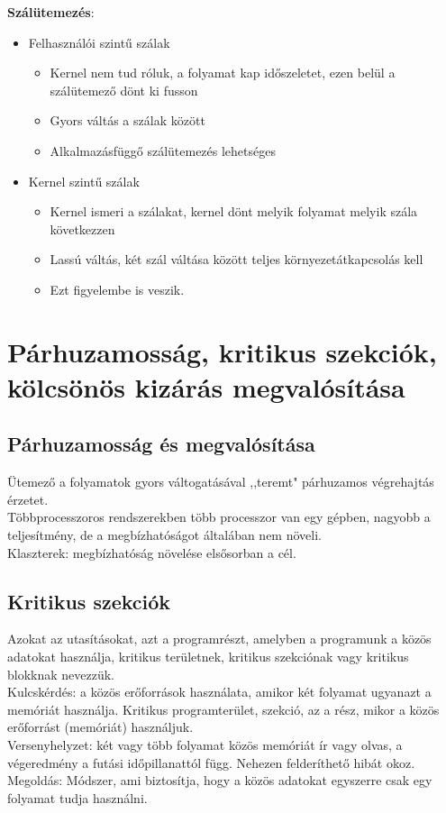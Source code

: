 \documentclass[margin=0px]{article}
\begin{document}
	\textbf{Szálütemezés}:
	\begin{itemize}
		\item Felhasználói szintű szálak
		\begin{itemize}
			\item Kernel nem tud róluk, a folyamat kap időszeletet, ezen belül a szálütemező dönt ki fusson
			\item Gyors váltás a szálak között
			\item Alkalmazásfüggő szálütemezés lehetséges
		\end{itemize}
		\item Kernel szintű szálak
		\begin{itemize}
			\item Kernel ismeri a szálakat, kernel dönt melyik folyamat melyik szála következzen
			\item Lassú váltás, két szál váltása között teljes környezetátkapcsolás kell
			\item Ezt figyelembe is veszik.
		\end{itemize}
	\end{itemize}
	
	\section{Párhuzamosság, kritikus szekciók, kölcsönös kizárás megvalósítása}
	
	\subsection{Párhuzamosság és megvalósítása}
	
	Ütemező a folyamatok gyors váltogatásával ,,teremt" párhuzamos végrehajtás érzetet. \\
	Többprocesszoros rendszerekben több processzor van egy gépben, nagyobb a teljesítmény, de a megbízhatóságot általában nem növeli. \\
	Klaszterek: megbízhatóság növelése elsősorban a cél.
	
	\subsection{Kritikus szekciók}
	
	Azokat az utasításokat, azt a programrészt, amelyben a programunk a közös adatokat használja, kritikus területnek, kritikus szekciónak vagy kritikus blokknak nevezzük. \\
	Kulcskérdés: a közös erőforrások használata, amikor két folyamat ugyanazt a memóriát használja. Kritikus programterület, szekció, az a rész, mikor a közös erőforrást (memóriát) használjuk. \\
	Versenyhelyzet: két vagy több folyamat közös memóriát ír vagy olvas, a végeredmény a futási időpillanattól függ. Nehezen felderíthető hibát okoz. \\
	Megoldás: Módszer, ami biztosítja, hogy a közös adatokat egyszerre csak egy folyamat tudja használni.
	
\end{document}
